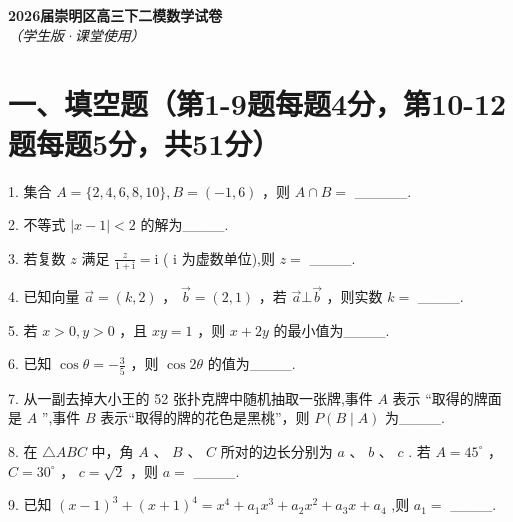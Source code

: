 \documentclass[10pt]{article}
\newcommand{\boardspace}[1]{%
  \par\vspace{#1}
}
\begin{document}
\begin{center}
\Large\textbf{2026届崇明区高三下二模数学试卷}\\[0.5em]
\normalsize\textit{（学生版·课堂使用）}
\end{center}

\section*{一、填空题（第1-9题每题4分，第10-12题每题5分，共51分）}

1. 集合 \(A = \{ 2,4,6,8,{10}\} ,B = \left( {-1,6}\right)\) ，则 \(A \cap  B =\) \_\_\_\_\_.

\boardspace{1.5cm}

2. 不等式 \(\left| {x - 1}\right|  < 2\) 的解为\_\_\_\_.

\boardspace{1.5cm}

3. 若复数 \(z\) 满足 \(\frac{z}{1 + \mathrm{i}} = \mathrm{i}\) ( \(\mathrm{i}\) 为虚数单位),则 \(z =\) \_\_\_\_.

\boardspace{1.5cm}

4. 已知向量 \(\overrightarrow{a} = \left( {k,2}\right)\) ， \(\overrightarrow{b} = \left( {2,1}\right)\) ，若 \(\overrightarrow{a}\bot \overrightarrow{b}\) ，则实数 \(k =\) \_\_\_\_.

\boardspace{1.5cm}

5. 若 \(x > 0,y > 0\) ，且 \({xy} = 1\) ，则 \(x + {2y}\) 的最小值为\_\_\_\_.

\boardspace{1.5cm}

6. 已知 \(\cos \theta  =  - \frac{3}{5}\) ，则 \(\cos {2\theta }\) 的值为\_\_\_\_.

\boardspace{1.5cm}

7. 从一副去掉大小王的 52 张扑克牌中随机抽取一张牌,事件 \(A\) 表示 ``取得的牌面是 \(A\) '',事件 \(B\) 表示``取得的牌的花色是黑桃''，则 \(P\left( {B \mid  A}\right)\) 为\_\_\_\_.

\boardspace{1.5cm}

8. 在 \(\bigtriangleup  {ABC}\) 中，角 \(A\) 、 \(B\) 、 \(C\) 所对的边长分别为 \(a\) 、 \(b\) 、 \(c\) . 若 \(A = {45}^{ \circ  }\) ， \(C = {30}^{ \circ  }\) ， \(c = \sqrt{2}\) ，则 \(a =\) \_\_\_\_.

\boardspace{1.5cm}

9. 已知 \({\left( x - 1\right) }^{3} + {\left( x + 1\right) }^{4} = {x}^{4} + {a}_{1}{x}^{3} + {a}_{2}{x}^{2} + {a}_{3}x + {a}_{4}\) ,则 \({a}_{1} =\) \_\_\_\_.

\boardspace{1.5cm}
\end{document}
